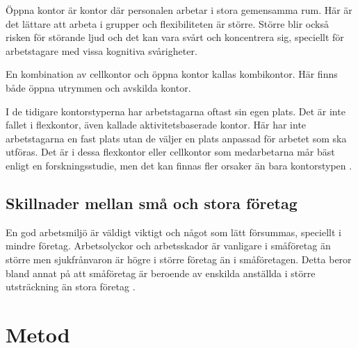Öppna kontor är kontor där personalen arbetar i stora gemensamma rum. Här är det lättare att arbeta i grupper och flexibiliteten är större. Större blir också risken för störande ljud och det kan vara svårt och koncentrera sig, speciellt för arbetstagare med vissa kognitiva svårigheter.

En kombination av cellkontor och öppna kontor kallas kombikontor. Här finns både öppna utrymmen och avskilda kontor.

I de tidigare kontorstyperna har arbetstagarna oftast sin egen plats. Det är inte fallet i flexkontor, även kallade aktivitetsbaserade kontor. Här har inte arbetstagarna en fast plats utan de väljer en plats anpassad för arbetet som ska utföras. Det är i dessa flexkontor eller cellkontor som medarbetarna mår bäst enligt en forskningsstudie, men det kan finnas fler orsaker än bara kontorstypen \cite{AVKontor}.

\subsection{Skillnader mellan små och stora företag}
En god arbetsmiljö är väldigt viktigt och något som lätt försummas, speciellt i mindre företag. Arbetsolyckor och arbetsskador är vanligare i småföretag än större men sjukfrånvaron är högre i större företag än i småföretagen. Detta beror bland annat på att småföretag är beroende av enskilda anställda i större utsträckning än stora företag \cite{smaforetag}.


\section{Metod}
\label{sec:method-hampus}

